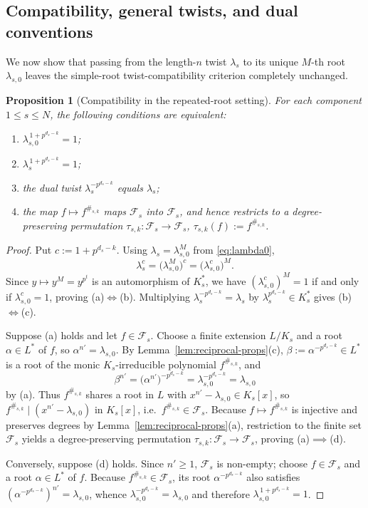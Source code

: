 \documentclass[preprint,12pt]{elsarticle}
\newcommand{\Fs}{\mathcal F_s}
\numberwithin{equation}{section}
\theoremstyle{plain}
\newtheorem{proposition}[theorem]{Proposition}
\theoremstyle{definition}
\theoremstyle{remark}
\begin{document}
\subsection{Compatibility, general twists, and dual conventions}\label{sec:compatibility}

We now show that passing from the length-$n$ twist $\lambda_s$ to its unique
$M$-th root $\lambda_{s,0}$ leaves the simple-root twist-compatibility criterion
completely unchanged.

\begin{proposition}[Compatibility in the repeated-root setting]\label{prop:compatibility}
For each component $1\le s\le N$, the following conditions are equivalent:
\begin{enumerate}
\item[\textup{(a)}] $\lambda_{s,0}^{\,1+p^{d_s-k}}=1$;
\item[\textup{(b)}] $\lambda_s^{\,1+p^{d_s-k}}=1$;
\item[\textup{(c)}] the dual twist $\lambda_s^{-p^{d_s-k}}$ equals $\lambda_s$;
\item[\textup{(d)}] the map $f\mapsto f^{\#_{s,k}}$ maps $\Fs$ into $\Fs$, and
hence restricts to a degree-preserving permutation
$\tau_{s,k}:\Fs\to\Fs$, $\tau_{s,k}(f):=f^{\#_{s,k}}$.
\end{enumerate}
\end{proposition}

\begin{proof}
Put $c:=1+p^{d_s-k}$. Using $\lambda_s=\lambda_{s,0}^M$ from \eqref{eq:lambda0},
\[
\lambda_s^c=\bigl(\lambda_{s,0}^M\bigr)^c=\bigl(\lambda_{s,0}^c\bigr)^M.
\]
Since $y\mapsto y^M=y^{p^t}$ is an automorphism of $K_s^*$, we have
$(\lambda_{s,0}^c)^M=1$ if and only if $\lambda_{s,0}^c=1$, proving
\textup{(a)}$\iff$\textup{(b)}. Multiplying $\lambda_s^{-p^{d_s-k}}=\lambda_s$ by
$\lambda_s^{p^{d_s-k}}\in K_s^*$ gives \textup{(b)}$\iff$\textup{(c)}.

Suppose \textup{(a)} holds and let $f\in\Fs$. Choose a finite extension $L/K_s$
and a root $\alpha\in L^*$ of $f$, so $\alpha^{n'}=\lambda_{s,0}$. By
Lemma~\ref{lem:reciprocal-props}\textup{(c)}, $\beta:=\alpha^{-p^{d_s-k}}\in L^*$
is a root of the monic $K_s$-irreducible polynomial $f^{\#_{s,k}}$, and
\[
\beta^{n'}=\bigl(\alpha^{n'}\bigr)^{-p^{d_s-k}}
          =\lambda_{s,0}^{-p^{d_s-k}}=\lambda_{s,0}
\]
by \textup{(a)}. Thus $f^{\#_{s,k}}$ shares a root in $L$ with
$x^{n'}-\lambda_{s,0}\in K_s[x]$, so $f^{\#_{s,k}}\mid(x^{n'}-\lambda_{s,0})$ in
$K_s[x]$, i.e.\ $f^{\#_{s,k}}\in\Fs$. Because $f\mapsto f^{\#_{s,k}}$ is
injective and preserves degrees by
Lemma~\ref{lem:reciprocal-props}\textup{(a)}, restriction to the finite set $\Fs$
yields a degree-preserving permutation $\tau_{s,k}:\Fs\to\Fs$, proving
\textup{(a)}$\implies$\textup{(d)}.

Conversely, suppose \textup{(d)} holds. Since $n'\ge 1$, $\Fs$ is non-empty; choose
$f\in\Fs$ and a root $\alpha\in L^*$ of $f$. Because $f^{\#_{s,k}}\in\Fs$, its
root $\alpha^{-p^{d_s-k}}$ also satisfies
$(\alpha^{-p^{d_s-k}})^{n'}=\lambda_{s,0}$, whence
$\lambda_{s,0}^{-p^{d_s-k}}=\lambda_{s,0}$ and therefore
$\lambda_{s,0}^{\,1+p^{d_s-k}}=1$.
\end{proof}
\end{document}
